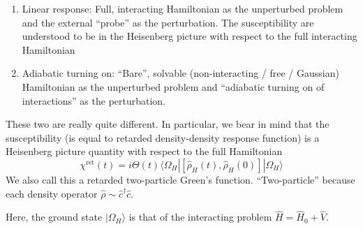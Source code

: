 \begin{enumerate}
    \item Linear response: Full, interacting Hamiltonian as the unperturbed problem and the external ``probe'' as the perturbation. The susceptibility are understood to be in the Heisenberg picture with respect to the full interacting Hamiltonian
    \item Adiabatic turning on: ``Bare'', solvable (non-interacting / free / Gaussian) Hamiltonian as the unperturbed problem and ``adiabatic turning on of interactions'' as the perturbation.
\end{enumerate}

These two are really quite different. In particular, we bear in mind that the susceptibility (is equal to retarded density-density response function) is a Heisenberg picture quantity with respect to the full Hamiltonian
\[ \chi ^{\mathrm{ret}}\left( t \right) =i\Theta \left( t \right) \langle \Omega _H|\left[ \hat{\rho}_H\left( t \right) ,\hat{\rho}_H\left( 0 \right) \right] |\Omega _H\rangle \]
We also call this a retarded two-particle Green's function. ``Two-particle'' because each density operator $\hat{\rho}\sim \hat{c}^{\dagger}\hat{c}$.

Here, the ground state $|\Omega_H\rangle$ is that of the interacting problem $\hat{H}=\hat{H}_0+\hat{V}$.

